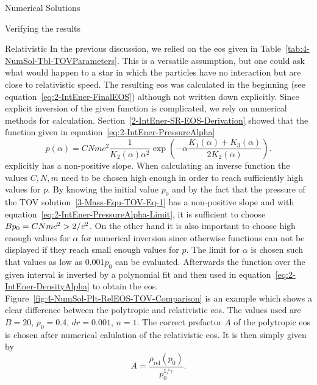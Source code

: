 \begin{section}{Numerical Solutions}
\begin{subsection}{Verifying the results}
% 
\end{subsection}
%
%
\begin{subsection}{Relativistic \texorpdfstring{}{EoS}}
\label{4-NumSol-Sec-RelEOS}
In the previous discussion, we relied on the \ac{eos} given in Table~\ref{tab:4-NumSol-Tbl-TOVParameters}.
This is a versatile assumption, but one could ask what would happen to a star in which the particles have no interaction but are close to relativistic speed.
The resulting \ac{eos} was calculated in the beginning (see equation~\eqref{eq:2-IntEner-FinalEOS}) although not written down explicitly.
Since explicit inversion of the given function is complicated, we rely on numerical methods for calculation.
Section~\ref{2-IntEner-SR-EOS-Derivation} showed that the function given in equation~\eqref{eq:2-IntEner-PressureAlpha}
\begin{equation}
	p(\alpha) = CNmc^2\frac{1}{K_2(\alpha)\alpha^2}\exp\left(-\alpha\frac{K_1(\alpha)+K_3(\alpha)}{2K_2(\alpha)}\right).
	\label{eq:4-NumSol-Pressure-Alpha-Dep}
\end{equation}
explicitly has a non-positive slope. 
When calculating an inverse function the values $C,N,m$ need to be chosen high enough in order to reach sufficiently high values for $p$.
By knowing the initial value $p_0$ and by the fact that the pressure of the \ac{TOV} solution~\eqref{3-Mass-Equ-TOV-Eq-1} has a non-positive slope and with equation~\eqref{eq:2-IntEner-PressureAlpha-Limit}, it is sufficient to choose $Bp_0=CNmc^2>2/\mathit{e}^2$.
On the other hand it is also important to choose high enough values for $\alpha$ for numerical inversion since otherwise functions can not be displayed if they reach small enough values for $p$.
The limit for $\alpha$ is chosen such that values as low as $0.001p_0$ can be evaluated.
Afterwards the function over the given interval is inverted by a polynomial fit and then used in equation~\eqref{eq:2-IntEner-DensityAlpha} to obtain the \ac{eos}.\\
Figure~\ref{fig:4-NumSol-Plt-RelEOS-TOV-Comparison} is an example which shows a clear difference between the polytropic and relativistic \ac{eos}.
The values used are $B=20$, $p_0=0.4$, $dr=0.001$, $n=1$.
The correct prefactor $A$ of the polytropic \ac{eos} is chosen after numerical calulation of the relativistic \ac{eos}.
It is then simply given by 
\begin{equation}
	A=\frac{\rho_\mathrm{rel}(p_0)}{p_0^{1/\gamma}}.
	\label{eq:4-NumSol-EOS-Factor-Explanation}

\end{equation}
\end{subsection}
\end{section}
